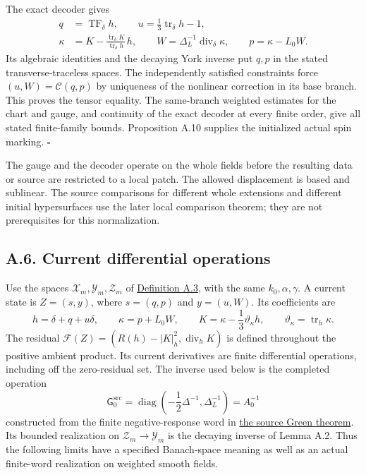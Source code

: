 \documentclass[
  english,
  11pt,
  reqno]{amsart}
\begin{document}
The exact decoder gives%
 \[
\begin{aligned}
q&=\operatorname{TF}_\delta h,
\qquad u=\frac13\operatorname{tr}_\delta h-1,\\
\kappa&=K-\frac{\operatorname{tr}_\delta K}{\operatorname{tr}_\delta h}\,h,
\qquad W=\Delta_L^{-1}\operatorname{div}_\delta\kappa,
\qquad p=\kappa-L_0W.
\end{aligned}
\] Its algebraic identities and the decaying York inverse put \(q,p\) in
the stated transverse-traceless spaces. The independently satisfied
constraints force \((u,W)=\mathcal C(q,p)\) by uniqueness of the
nonlinear correction in its base branch. This proves the tensor
equality. The same-branch weighted estimates for the chart and gauge,
and continuity of the exact decoder at every finite order, give all
stated finite-family bounds. Proposition A.10 supplies the initialized
actual spin marking. \hfill\(\square\)

The gauge and the decoder operate on the whole fields before the
resulting data or source are restricted to a local patch. The allowed
displacement is based and sublinear. The source comparisons for
different whole extensions and different initial hypersurfaces use the
later local comparison theorem; they are not prerequisites for this
normalization.

\subsection{A.6. Current differential
operations}\label{a.6.-current-differential-operations}\label{sec:online-current-residual-derivatives}

Use the spaces \(\mathcal X_m,\mathcal Y_m,\mathcal Z_m\) of
\hyperref[def:online-chart-seeds-and-target]{Definition A.3}, with the
same \(k_0,\alpha,\gamma\). A current state is \(Z=(s,y)\), where
\(s=(q,p)\) and \(y=(u,W)\). Its coefficients are%
 \[
h=\delta+q+u\delta,\qquad
\kappa=p+L_0W,\qquad
K=\kappa-\frac13\vartheta_\kappa h,\qquad
\vartheta_\kappa=\operatorname{tr}_h\kappa.
\] The residual \(\mathcal F(Z)=(R(h)-|K|_h^2,\operatorname{div}_hK)\)
is defined throughout the positive ambient product. Its current
derivatives are finite differential operations, including off the
zero-residual set. The inverse used below is the completed operation%
 \[
\mathsf G_0^{\mathrm{src}}
=\operatorname{diag}\left(-\frac12\Delta^{-1},\Delta_L^{-1}\right)
=A_0^{-1}
\] constructed from the finite negative-response word in
\hyperref[thm:online-negative-response-flat-green]{the source Green
theorem}. Its bounded realization on \(\mathcal Z_m\to\mathcal Y_m\) is
the decaying inverse of Lemma A.2. Thus the following limits have a
specified Banach-space meaning as well as an actual finite-word
realization on weighted smooth fields.
\end{document}
